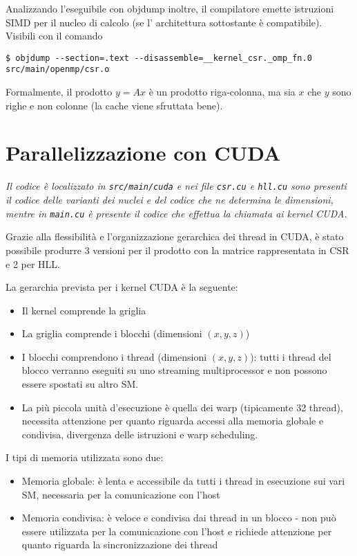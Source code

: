 \documentclass[9pt]{extarticle}
\begin{document}
Analizzando l'eseguibile con objdump inoltre, il compilatore emette istruzioni SIMD per il nucleo di calcolo (se l'
architettura sottostante è compatibile). Visibili con il comando
\begin{lstlisting}
$ objdump --section=.text --disassemble=__kernel_csr._omp_fn.0 src/main/openmp/csr.o
\end{lstlisting}

Formalmente, il prodotto $y = Ax$ è un prodotto riga-colonna, ma sia $x$ che $y$ sono righe e non colonne (la cache
viene sfruttata bene).

\section{Parallelizzazione con CUDA}
\textit{Il codice è localizzato in \texttt{src/main/cuda} e nei file \texttt{csr.cu} e \texttt{hll.cu} sono presenti il
codice delle varianti dei nuclei e del codice che ne determina le dimensioni, mentre in \texttt{main.cu} è presente
il codice che effettua la chiamata ai kernel CUDA.}

Grazie alla flessibilità e l'organizzazione gerarchica dei thread in CUDA, è stato possibile produrre 3 versioni per il 
prodotto con la matrice rappresentata in CSR e 2 per HLL.

La gerarchia prevista per i kernel CUDA è la seguente:
\begin{itemize}
	\item Il kernel comprende la griglia
	\item La griglia comprende i blocchi (dimensioni $(x,y,z)$)
	\item I blocchi comprendono i thread (dimensioni $(x,y,z)$): 
	tutti i thread del blocco verranno eseguiti su uno streaming multiprocessor e non possono essere spostati su altro SM.
	\item La più piccola unità d'esecuzione è quella dei warp (tipicamente 32 thread), necessita attenzione per quanto
	riguarda accessi alla memoria globale e condivisa, divergenza delle istruzioni e warp scheduling.
\end{itemize}

I tipi di memoria utilizzata sono due:
\begin{itemize}
	\item Memoria globale: è lenta e accessibile da tutti i thread in esecuzione sui vari SM, necessaria per la
	comunicazione con l'host
	\item Memoria condivisa: è veloce e condivisa dai thread in un blocco - non può essere utilizzata per la comunicazione
	con l'host e richiede attenzione per quanto riguarda la sincronizzazione dei thread
\end{itemize}
	
\end{document}
